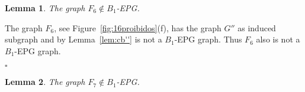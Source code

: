 \documentclass[9pt]{entcs}
\newtheorem{lema}{Lemma}[section]
\begin{document}




\begin{lema}\label{lem:f6}
The graph $F_{6} \notin B_1$-EPG. 
\end{lema}

\begin{pf}
The graph $F_6$, see Figure~\ref{fig:16proibidos}(f), has the graph $G''$ as induced subgraph and by Lemma~\ref{lem:cb''} is not a $B_1$-EPG graph. Thus $F_6$ also is not a $B_1$-EPG graph.

%
 $\square$\end{pf} 

\begin{lema}\label{lem:f7}
The graph $F_{7} \notin B_1$-EPG. 
\end{lema}
\end{document}
